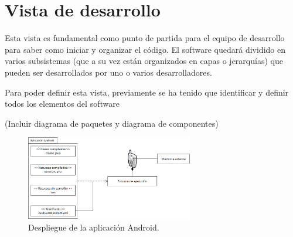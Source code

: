 \chapter{Vista de desarrollo}
Esta vista es fundamental como punto de partida para el equipo de desarrollo para saber como iniciar y organizar el código. El software quedará dividido en varios subsistemas (que a su vez están organizados en capas o jerarquías) que pueden ser desarrollados por uno o varios desarrolladores.

Para poder definir esta vista, previamente se ha tenido que identificar y definir todos los elementos del software

(Incluir diagrama de paquetes y diagrama de componentes)

\begin{figure}
	\centering
	\includegraphics[width=0.65\textwidth]{4.Disenio/Imagenes/AppAndroid}
	\caption{Despliegue de la aplicación Android.}
	\label{fig:appAndroid}
\end{figure}
